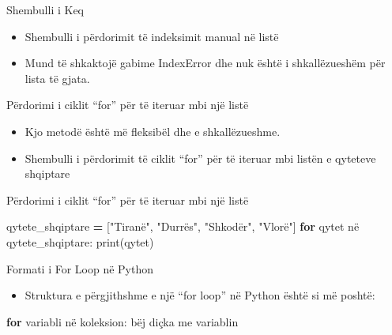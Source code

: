 \documentclass[
  ignorenonframetext,
]{beamer}
\newenvironment{Shaded}{\begin{snugshade}}{\end{snugshade}}
\newcommand{\BuiltInTok}[1]{#1}
\newcommand{\ControlFlowTok}[1]{\textcolor[rgb]{0.13,0.29,0.53}{\textbf{#1}}}
\newcommand{\NormalTok}[1]{#1}
\newcommand{\OperatorTok}[1]{\textcolor[rgb]{0.81,0.36,0.00}{\textbf{#1}}}
\newcommand{\StringTok}[1]{\textcolor[rgb]{0.31,0.60,0.02}{#1}}
\providecommand{\tightlist}{%
  \setlength{\itemsep}{0pt}\setlength{\parskip}{0pt}}
\begin{document}
\begin{frame}{Shembulli i Keq}
\protect\hypertarget{shembulli-i-keq}{}
\begin{itemize}
\item
  Shembulli i përdorimit të indeksimit manual në listë
\item
  Mund të shkaktojë gabime IndexError dhe nuk është i shkallëzueshëm për
  lista të gjata.
\end{itemize}
\end{frame}

\begin{frame}{Përdorimi i ciklit ``for'' për të iteruar mbi një listë}
\protect\hypertarget{puxebrdorimi-i-ciklit-for-puxebr-tuxeb-iteruar-mbi-njuxeb-listuxeb}{}
\begin{itemize}
\item
  Kjo metodë është më fleksibël dhe e shkallëzueshme.
\item
  Shembulli i përdorimit të ciklit ``for'' për të iteruar mbi listën e
  qyteteve shqiptare
\end{itemize}
\end{frame}

\begin{frame}[fragile]{Përdorimi i ciklit ``for'' për të iteruar mbi një
listë}
\protect\hypertarget{puxebrdorimi-i-ciklit-for-puxebr-tuxeb-iteruar-mbi-njuxeb-listuxeb-1}{}
\begin{Shaded}
\begin{Highlighting}[]
\NormalTok{qytete\_shqiptare }\OperatorTok{=}\NormalTok{ [}\StringTok{"Tiranë"}\NormalTok{, }\StringTok{"Durrës"}\NormalTok{, }\StringTok{"Shkodër"}\NormalTok{, }\StringTok{"Vlorë"}\NormalTok{]}
\ControlFlowTok{for}\NormalTok{ qytet në qytete\_shqiptare:}
    \BuiltInTok{print}\NormalTok{(qytet)}
\end{Highlighting}
\end{Shaded}
\end{frame}

\begin{frame}[fragile]{Formati i For Loop në Python}
\protect\hypertarget{formati-i-for-loop-nuxeb-python}{}
\begin{itemize}
\tightlist
\item
  Struktura e përgjithshme e një ``for loop'' në Python është si më
  poshtë:
\end{itemize}

\begin{Shaded}
\begin{Highlighting}[]
\ControlFlowTok{for}\NormalTok{ variabli në koleksion:}
\NormalTok{    bëj diçka me variablin}
\end{Highlighting}
\end{Shaded}
\end{frame}
\end{document}

